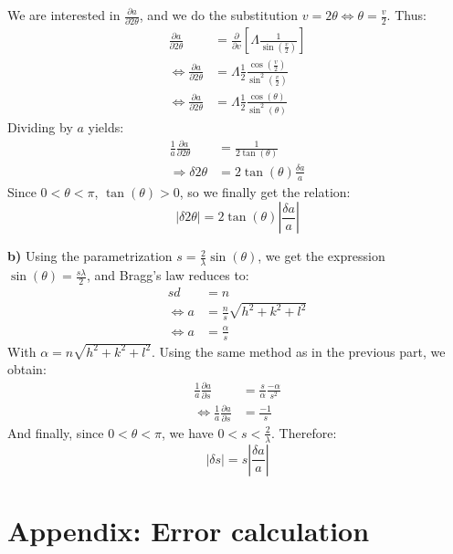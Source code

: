 \documentclass[12pt]{article}
\begin{document}
We are interested in $\frac{\partial a}{\partial2\theta}$, and we do the substitution $v = 2\theta \Leftrightarrow \theta = \frac{v}{2}$. Thus:
\begin{align}
    \frac{\partial a}{\partial2\theta} &= \frac{\partial }{\partial v} \left[ \Lambda\frac{1}{\sin(\frac{v}{2})} \right] \\
    \Leftrightarrow \frac{\partial a}{\partial2\theta} &= \Lambda \frac{1}{2} \frac{\cos(\frac{v}{2})}{\sin^2(\frac{v}{2})} \\
    \Leftrightarrow \frac{\partial a}{\partial2\theta} &= \Lambda \frac{1}{2} \frac{\cos(\theta)}{\sin^2(\theta)}
\end{align}
Dividing by $a$ yields:
\begin{align}
    \frac{1}{a}\frac{\partial a}{\partial2\theta} &= \frac{1}{2 \tan(\theta)} \\
    \Rightarrow \delta2\theta &= 2\tan(\theta)\frac{\delta a}{a}
\end{align}
Since $0<\theta< \pi$, $\tan(\theta) > 0$, so we finally get the relation:
\begin{equation}
    \left|\delta2\theta\right| = 2\tan(\theta)\left|\frac{\delta a}{a}\right|
\end{equation}

\textbf{b)} Using the parametrization $s = \frac{2}{\lambda} \sin(\theta)$, we get the expression $\sin(\theta) = \frac{s \lambda}{2}$, and Bragg's law reduces to:
\begin{align}
    sd &= n \\
    \Leftrightarrow a &= \frac{n}{s} \sqrt{h^2+k^2+l^2} \\
    \Leftrightarrow a &= \frac{\alpha}{s}
\end{align}
With $\alpha = n\sqrt{h^2+k^2+l^2}$. Using the same method as in the previous part, we obtain:
\begin{align}
    \frac{1}{a} \frac{\partial a}{\partial s} &= \frac{s}{\alpha} \frac{-\alpha}{s^2} \\ 
    \Leftrightarrow \frac{1}{a} \frac{\partial a}{\partial s} &= \frac{-1}{s} 
\end{align}
And finally, since $0<\theta<\pi$, we have $0<s<\frac{2}{\lambda}$. Therefore:
\begin{equation}
    \left| \delta s\right| = s \left| \frac{\delta a}{a} \right|    
\end{equation}

\newpage

\section{Appendix: Error calculation}
\end{document}
